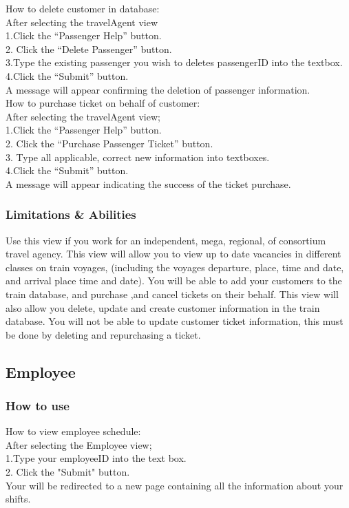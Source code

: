\documentclass[letter]{article}
\begin{document}
How to delete customer in database:\\
After selecting the travelAgent view \\ 
1.Click the “Passenger Help” button.\\
2. Click the “Delete Passenger” button.\\
3.Type the existing passenger you wish to deletes  passengerID into the textbox.\\
4.Click the “Submit” button. \\
A message will appear confirming the deletion of  passenger information.\\


How to purchase ticket on behalf of customer:\\
After selecting the travelAgent view; \\ 
1.Click the “Passenger Help” button.\\
2. Click the “Purchase Passenger Ticket” button.\\
3. Type all applicable, correct new information into textboxes.\\
4.Click the “Submit” button. \\
A message will appear indicating the success of the ticket purchase.\\







\subsubsection{Limitations \& Abilities}
Use this view if you work for an independent, mega, regional, of consortium travel agency. This view will allow you to view up to date vacancies in different classes on train voyages, (including the voyages departure, place, time and date, and arrival place time and date).  You will be able to add your customers to the train database, and purchase ,and cancel tickets on their behalf. This view will also allow you delete, update and create customer information in the train database. You will not be able to update customer ticket information, this must be done by deleting and repurchasing a ticket. 


\subsection{Employee}
\subsubsection{How to use}
How to view employee schedule:\\
After selecting the Employee view;\\ 
1.Type your employeeID into the text box.\\
2. Click the "Submit" button. \\
Your will be redirected to a new page containing all the information about your shifts. \\
\end{document}
